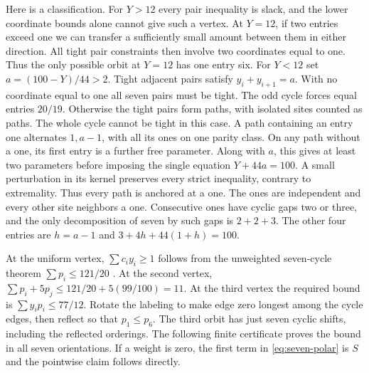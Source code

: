 \documentclass[11pt,a4paper]{article}
\theoremstyle{definition}
\begin{document}
Here is a classification. For $Y>12$ every pair inequality is slack,
and the lower coordinate bounds alone cannot give such a vertex. At $Y=12$,
if two entries exceed one we can transfer a sufficiently small amount between
them in either direction. All tight pair constraints then involve two
coordinates equal to one. Thus the only possible orbit at $Y=12$ has one
entry six. For $Y<12$ set $a=(100-Y)/44>2$. Tight adjacent pairs satisfy
$y_i+y_{i+1}=a$. With no coordinate equal to one all seven pairs must be
tight. The odd cycle forces equal entries $20/19$. Otherwise the tight pairs
form paths, with isolated sites counted as paths. The whole cycle cannot be
tight in this case. A path containing an entry one alternates $1,a-1$, with
all its ones on one parity class. On any path without a one, its first entry
is a further free parameter. Along with $a$, this gives at least two parameters
before imposing the single equation $Y+44a=100$. A small perturbation in its
kernel preserves every strict inequality, contrary to extremality. Thus every
path is anchored at a one. The ones are independent and every other site
neighbors a one. Consecutive ones have cyclic gaps two or three, and the
only decomposition of seven by such gaps is $2+2+3$. The other four entries
are $h=a-1$ and $3+4h+44(1+h)=100$.

At the uniform vertex, $\sum c_i y_i\ge1$ follows from the unweighted
seven-cycle theorem $\sum p_i\le121/20$ \cite{Jiang}. At the second vertex,
$\sum p_i+5p_j\le121/20+5(99/100)=11$. At the third vertex the required
bound is $\sum y_ip_i\le77/12$. Rotate the labeling to make edge zero
longest among the cycle edges, then reflect so that $p_1\le p_6$.
The third orbit has just seven cyclic shifts, including the reflected
orderings. The following finite certificate proves the bound in all seven
orientations. If a weight is zero, the first term in \eqref{eq:seven-polar}
is $S$ and the pointwise claim follows directly.
\end{document}
